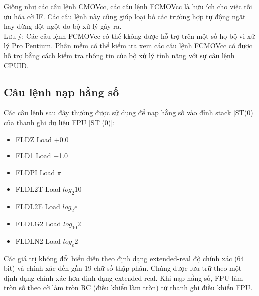 		Giống như các câu lệnh CMOVcc, các câu lệnh FCMOVcc là hữu ích cho việc tối ưu hóa cờ IF. Các câu lệnh này cũng giúp loại bỏ các trường hợp tự động ngăt hay dừng đột ngột do bộ xử lý gây ra.\\
		
	Lưu ý: Các câu lệnh FCMOVcc có thể không được hỗ trợ trên một số họ bộ vi xử lý Pro Pentium. Phần mềm có thể kiểm tra xem các câu lệnh FCMOVcc có được hỗ trợ bằng cách kiểm tra thông tin của bộ xử lý tính năng với sự câu lệnh CPUID.

		\subsection*{Câu lệnh nạp hằng số}
		Các câu lệnh sau đây thường được sử dụng để nạp hằng số vào đỉnh stack [ST(0)] của thanh ghi dữ liệu FPU [ST (0)]:
		\begin{itemize}
			\renewcommand{\labelitemi}{}
			\item FLDZ Load +0.0
			\item FLD1 Load +1.0
			\item FLDPI Load $\pi$
			\item FLDL2T Load $log_{2}10$
			\item FLDL2E Load $log_{2}e$
			\item FLDLG2 Load $log_{10}2$
			\item FLDLN2 Load $log_{e}2$
		\end{itemize}					

		Các giá trị không đổi biểu diễn theo định dạng extended-real độ chính xác (64 bit) và chính xác đến gần 19 chữ số thập phân. Chúng được lưu trữ theo một định dạng chính xác hơn định dạng extended-real. Khi nạp hằng số, FPU làm tròn số theo cờ làm tròn RC (điều khiển làm tròn) từ thanh ghi điều khiển FPU. 

